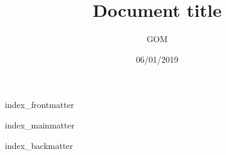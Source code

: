 \documentclass[a4paper]{report}
\title{Document title}
\author{GOM}
\date{06/01/2019}
\begin{document}
{index_frontmatter}


{index_mainmatter}


{index_backmatter}
\end{document}

